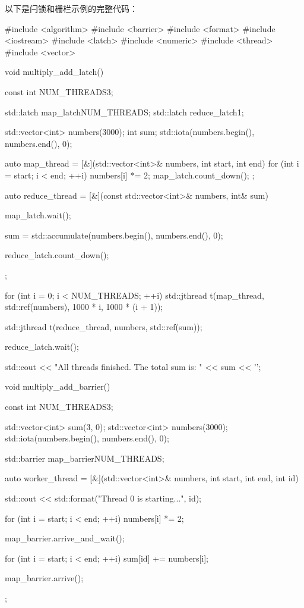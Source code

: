 以下是闩锁和栅栏示例的完整代码：

\begin{cpp}
#include <algorithm>
#include <barrier>
#include <format>
#include <iostream>
#include <latch>
#include <numeric>
#include <thread>
#include <vector>

void multiply_add_latch() {
    const int NUM_THREADS{3};

    std::latch map_latch{NUM_THREADS};
    std::latch reduce_latch{1};

    std::vector<int> numbers(3000);
    int sum{};
    std::iota(numbers.begin(), numbers.end(), 0);

    auto map_thread = [&](std::vector<int>& numbers, int start, int
    end) {
        for (int i = start; i < end; ++i) {
            numbers[i] *= 2;
        }
        map_latch.count_down();
    };

    auto reduce_thread = [&](const std::vector<int>& numbers, int&
    sum) {
        map_latch.wait();

        sum = std::accumulate(numbers.begin(), numbers.end(), 0);

        reduce_latch.count_down();
    };

    for (int i = 0; i < NUM_THREADS; ++i) {
        std::jthread t(map_thread, std::ref(numbers), 1000 * i, 1000 *
        (i + 1));
    }

    std::jthread t(reduce_thread, numbers, std::ref(sum));

    reduce_latch.wait();

    std::cout << "All threads finished. The total sum is: " << sum << '\n';
}

void multiply_add_barrier() {
    const int NUM_THREADS{3};

    std::vector<int> sum(3, 0);
    std::vector<int> numbers(3000);
    std::iota(numbers.begin(), numbers.end(), 0);

    std::barrier map_barrier{NUM_THREADS};

    auto worker_thread = [&](std::vector<int>& numbers, int start, int
    end, int id) {
        std::cout << std::format("Thread {0} is starting...\n", id);

        for (int i = start; i < end; ++i) {
            numbers[i] *= 2;
        }

        map_barrier.arrive_and_wait();

        for (int i = start; i < end; ++i) {
            sum[id] += numbers[i];
        }

        map_barrier.arrive();
    };

}
\end{cpp}
